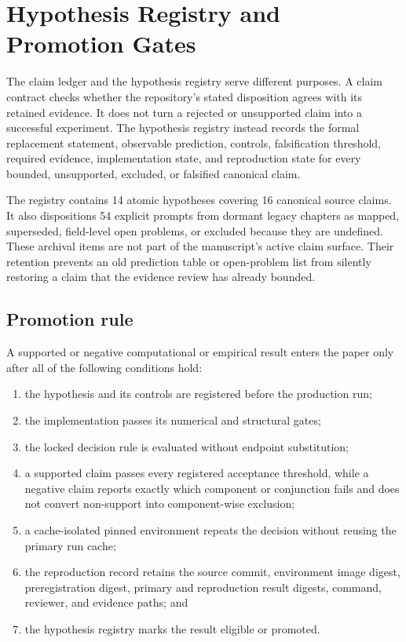 
\chapter{Hypothesis Registry and Promotion Gates}
\label{ch:hypothesis-registry}

The claim ledger and the hypothesis registry serve different purposes. A claim
contract checks whether the repository's stated disposition agrees with its
retained evidence. It does not turn a rejected or unsupported claim into a
successful experiment. The hypothesis registry instead records the formal
replacement statement, observable prediction, controls, falsification
threshold, required evidence, implementation state, and reproduction state for
every bounded, unsupported, excluded, or falsified canonical claim.

The registry contains 14 atomic hypotheses covering 16 canonical source claims.
It also dispositions 54 explicit prompts from dormant legacy chapters as
mapped, superseded, field-level open problems, or excluded because they are
undefined. These archival items are not part of the manuscript's active claim
surface. Their retention prevents an old prediction table or open-problem list
from silently restoring a claim that the evidence review has already bounded.

\section{Promotion rule}

A supported or negative computational or empirical result enters the paper
only after all of the following conditions hold:

\begin{enumerate}
  \item the hypothesis and its controls are registered before the production
    run;
  \item the implementation passes its numerical and structural gates;
  \item the locked decision rule is evaluated without endpoint substitution;
  \item a supported claim passes every registered acceptance threshold, while
    a negative claim reports exactly which component or conjunction fails and
    does not convert non-support into component-wise exclusion;
  \item a cache-isolated pinned environment repeats the decision without
    reusing the primary run cache;
  \item the reproduction record retains the source commit, environment image
    digest, preregistration digest, primary and reproduction result digests,
    command, reviewer, and evidence paths; and
  \item the hypothesis registry marks the result eligible or promoted.
\end{enumerate}

